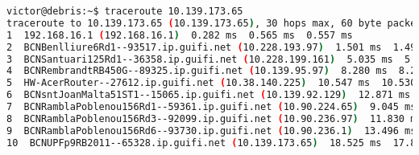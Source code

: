 \begin{lstlisting}[language=bash, caption={Route from a Guifi.net client without alternative paths interfering.}]
victor@debris:~$ traceroute 10.139.173.65
traceroute to 10.139.173.65 (10.139.173.65), 30 hops max, 60 byte packets
1  192.168.16.1 (192.168.16.1)  0.282 ms  0.565 ms  0.557 ms
2  BCNBenlliure6Rd1--93517.ip.guifi.net (10.228.193.97)  1.501 ms  1.492 ms  1.482 ms
3  BCNSantuari125Rd1--36358.ip.guifi.net (10.228.199.161)  5.035 ms  5.280 ms  5.270 ms
4  BCNRembrandtRB450G--89325.ip.guifi.net (10.139.95.97)  8.280 ms  8.271 ms  9.841 ms
5  HW-AcerRouter--27612.ip.guifi.net (10.38.140.225)  10.547 ms  10.530 ms  10.526 ms
6  BCNsntJoanMalta51ST1--15065.ip.guifi.net (10.139.92.129)  12.871 ms  8.685 ms  8.375 ms
7  BCNRamblaPoblenou156Rd1--59361.ip.guifi.net (10.90.224.65)  9.045 ms  9.042 ms  13.293 ms
8  BCNRamblaPoblenou156Rd3--92099.ip.guifi.net (10.90.236.97)  11.830 ms  13.261 ms  13.253 ms
9  BCNRamblaPoblenou156Rd6--93730.ip.guifi.net (10.90.236.1)  13.496 ms  16.259 ms  17.499 ms
10  BCNUPFp9RB2011--65328.ip.guifi.net (10.139.173.65)  18.525 ms  17.842 ms  18.505 ms
\end{lstlisting}
